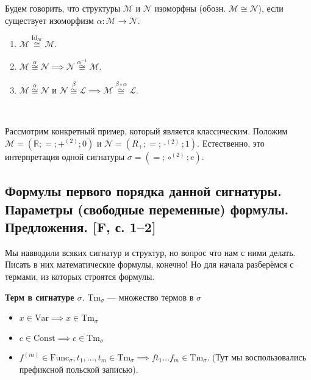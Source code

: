 \documentclass[a4paper, fleqn]{article}
\begin{document}
    \begin{definition}
        Будем говорить, что структуры $\mathcal{M}$ и $\mathcal{N}$ изоморфны (обозн. $\mathcal{M} \cong \mathcal{N}$), если существует изоморфизм $\alpha \colon \mathcal{M} \to \mathcal{N}$.
    \end{definition}
    
    \begin{proposition}
        \begin{enumerate}
            \item $\mathcal{M} \overset{\text{Id}_{\mathcal{M}}}{\cong} \mathcal{M}$.
            \item $\mathcal{M} \overset{\alpha}{\cong} \mathcal{N} \implies \mathcal{N} \overset{\alpha^{-1}}{\cong} \mathcal{M}$.
            \item $\mathcal{M} \overset{\alpha}{\cong} \mathcal{N}$ и $\mathcal{N} \overset{\beta}{\cong} \mathcal{L} \implies \mathcal{M} \overset{\beta \circ \alpha}{\cong} \mathcal{L}$.
        \end{enumerate}
    \end{proposition}~
    \begin{example}
    Рассмотрим конкретный пример, который является классическим.
    Положим $\mathcal{M} = \left( \mathbb{R}; =; +^(2); 0 \right)$ и $\mathcal{N} = \left( R_{+}; =; \cdot^{(2)}; 1 \right)$.
    Естественно, это интерпретация одной сигнатуры $\sigma = \left( =; \circ^{(2)}; e \right)$.
    \end{example}
    \subsection{Формулы первого порядка данной сигнатуры. Параметры (свободные переменные) формулы. Предложения. [F, с. 1–2]}
    Мы навводили всяких сигнатур и структур, но вопрос что нам с ними делать. Писать в них
    математические формулы, конечно! Но для начала разберёмся с термами, из которых строятся формулы.

    \begin{definition}
        \textbf{Терм в сигнатуре $\sigma$}. $\text{Tm}_\sigma$ --- множество термов в $\sigma$
        \begin{itemize}
            \item $x \in \text{Var} \implies x \in \text{Tm}_\sigma$
            \item $c \in \text{Const} \implies c \in \text{Tm}_\sigma$
            \item $f^{(m)} \in \text{Func}_\sigma, t_1, \dots, t_m \in \text{Tm}_\sigma
            \implies f t_1 \dots f_m \in \text{Tm}_\sigma$. (Тут мы воспользовались префиксной 
            польской записью).
        \end{itemize}
    \end{definition}
\end{document}
